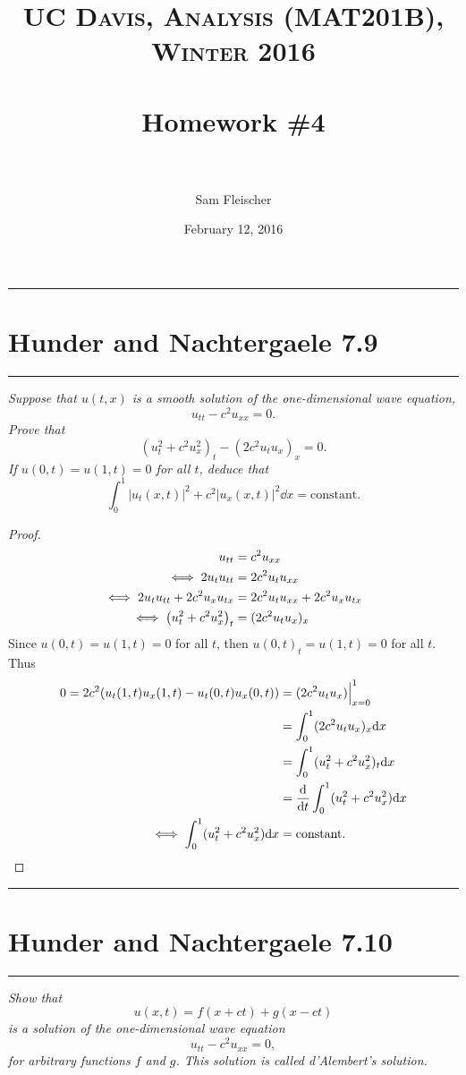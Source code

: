 \documentclass{article} %
\title{ 
\normalfont \normalsize 
\textsc{UC Davis, Analysis (MAT201B), Winter 2016} \\ [25pt] %
\horrule{2pt} \\[0.4cm] %
\Huge Homework \#4 \\ %
\horrule{2pt} \\[0.5cm] %
}
\author{\huge Sam Fleischer} %
\date{February 12, 2016} %
\theoremstyle{plain}
\newcommand{\problem}[1]{
\begin{minipage}{\textwidth}
    \begin{center}
        \noindent\rule{5cm}{1pt}
    \end{center}
    \section{\bf #1}
    \begin{center}
        \noindent\rule{5cm}{1pt}
    \end{center}
    \vspace{0.25cm}
\end{minipage}
}
\numberwithin{equation}{section} %
\numberwithin{figure}{section} %
\numberwithin{table}{section} %
\begin{document}
\thispagestyle{empty}

\maketitle %

\makeatletter
{}
\makeatother

\pagebreak

\problem{Hunder and Nachtergaele 7.9}
\emph{Suppose that $u(t,x)$ is a smooth solution of the one-dimensional wave equation, $$u_{tt} - c^2 u_{xx} = 0.$$  Prove that $$(u_t^2 + c^2 u_x^2)_t - (2c^2 u_t u_x)_x = 0.$$  If $u(0, t) = u(1, t) = 0$ for all $t$, deduce that $$\int_0^1 |u_t(x,t)|^2 + c^2|u_x(x,t)|^2\dd x = \text{constant}.$$}

\begin{proof}
    \begin{align*}
        u_{tt} &= c^2 u_{xx} \\
        \iff 2u_tu_{tt} &= 2c^2 u_tu_{xx} \\
        \iff 2u_tu_{tt} + 2c^2 u_x u_{tx} &= 2c^2u_tu_{xx} + 2c^2 u_x u_{tx} \\
        \iff \qty(u_t^2 + c^2u_x^2)_t &= (2c^2 u_t u_x)_x
    \end{align*}
    Since $u(0,t) = u(1,t) = 0$ for all $t$, then $u(0,t)_t = u(1,t) = 0$ for all $t$.  Thus
    \begin{align*}
        0 = 2c^2\qty(u_t(1,t)u_x(1,t) - u_t(0,t)u_x(0,t)) &= (2c^2 u_tu_x)\Big|_{x=0}^1 \\
        &= \int_0^1(2c^2 u_t u_x)_x \dd x \\
        &= \int_0^1(u_t^2 + c^2 u_x^2)_t\dd x \\
        &= \frac{\dd}{\dd t}\int_0^1(u_t^2 + c^2 u_x^2)\dd x \\
        \iff \int_0^1 (u_t^2 + c^2 u_x^2)\dd x &= \text{constant}.
    \end{align*}
\end{proof}

\problem{Hunder and Nachtergaele 7.10}
\emph{Show that $$u(x,t) = f(x + ct) + g(x - ct)$$ is a solution of the one-dimensional wave equation $$u_{tt} - c^2u_{xx} = 0,$$ for arbitrary functions $f$ and $g$.  This solution is called \emph{d'Alembert's solution}.} \\
\end{document}
